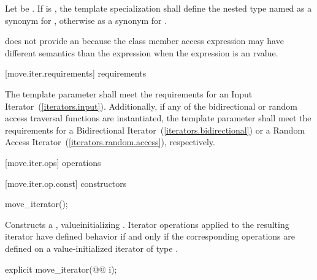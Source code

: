 \begin{addedblock}
{\color{newclr}
\pnum
Let  be . If 
is , the template specialization  shall define the nested
type named  as a synonym for , otherwise
as a synonym for .

\pnum
\enternote {} does not provide an  because the class member access
expression  may have different semantics than the expression
 when the expression  is an rvalue.\exitnote
}
\end{addedblock}

\begin{removedblock}
[move.iter.requirements]{ requirements}

\pnum
The template parameter  shall meet
the requirements for an Input Iterator~(\ref{iterators.input}).
Additionally, if any of the bidirectional or random access traversal
functions are instantiated, the template parameter shall meet the
requirements for a Bidirectional Iterator~(\ref{iterators.bidirectional})
or a Random Access Iterator~(\ref{iterators.random.access}), respectively.
\end{removedblock}

[move.iter.ops]{ operations}

[move.iter.op.const]{ constructors}

%
\begin{itemdecl}
move_iterator();
\end{itemdecl}

\begin{itemdescr}
\pnum
\effects Constructs a , value\added{-}initializing
. Iterator operations applied to the resulting
iterator have defined behavior if and only if the corresponding operations are defined
on a value-initialized iterator of type .
\end{itemdescr}


%
\begin{itemdecl}
explicit move_iterator(@@ i);
\end{itemdecl}

